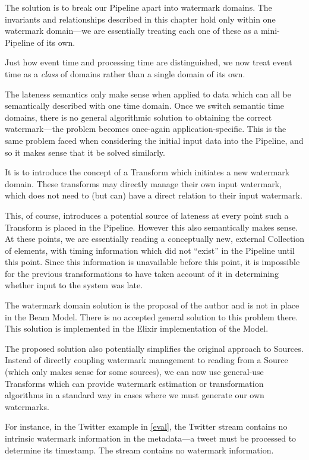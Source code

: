 The solution is to break our Pipeline apart into watermark domains.
The invariants and relationships described in this chapter hold only within one watermark domain---we are essentially treating each one of these as a mini-Pipeline of its own.

Just how event time and processing time are distinguished, we now treat event time as a \emph{class} of domains rather than a single domain of its own.

The lateness semantics only make sense when applied to data which can all be semantically described with one time domain.
Once we switch semantic time domains, there is no general algorithmic solution to obtaining the correct watermark---the problem becomes once-again application-specific.
This is the same problem faced when considering the initial input data into the Pipeline, and so it makes sense that it be solved similarly.

It is to introduce the concept of a Transform which initiates a new watermark domain.
These transforms may directly manage their own input watermark, which does not need to (but can) have a direct relation to their input watermark.

This, of course, introduces a potential source of lateness at every point such a Transform is placed in the Pipeline.
However this also semantically makes sense.
At these points, we are essentially reading a conceptually new, external Collection of elements, with timing information which did not ``exist'' in the Pipeline until this point.
Since this information is unavailable before this point, it is impossible for the previous transformations to have taken account of it in determining whether input to the system was late.

The watermark domain solution is the proposal of the author and is not in place in the Beam Model.
There is no accepted general solution to this problem there.
This solution is implemented in the Elixir implementation of the Model.

The proposed solution also potentially simplifies the original approach to Sources.
Instead of directly coupling watermark management to reading from a Source (which only makes sense for some sources), we can now use general-use Transforms which can provide watermark estimation or transformation algorithms in a standard way in cases where we must generate our own watermarks.

For instance, in the Twitter example in \cref{eval}, the Twitter stream contains no intrinsic watermark information in the metadata---a tweet must be processed to determine its timestamp.
The stream contains no watermark information.

